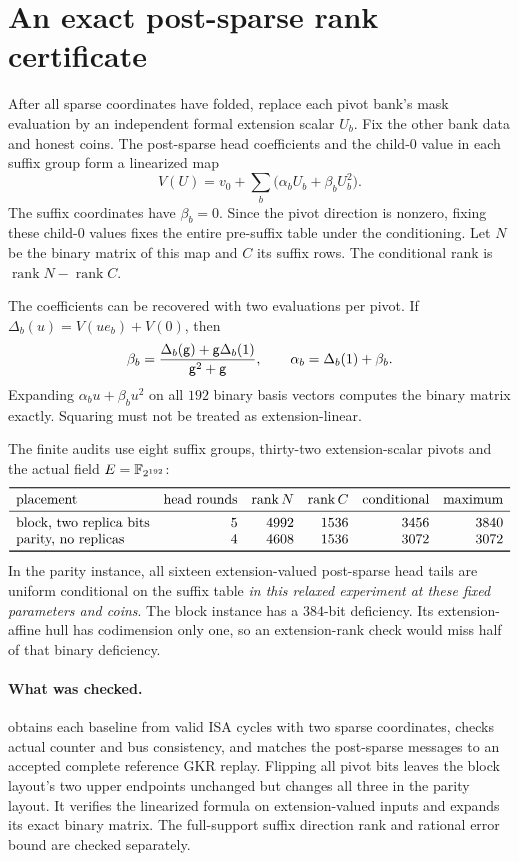 \documentclass[11pt]{article}
\begin{document}
\section{An exact post-sparse rank certificate}

After all sparse coordinates have folded, replace each pivot bank's mask evaluation by an independent formal extension scalar $U_b$. Fix the other bank data and honest coins. The post-sparse head coefficients and the child-$0$ value in each suffix group form a linearized map
\[
 V(U)=v_0+\sum_b\bigl(\alpha_bU_b+\beta_bU_b^2\bigr).
\]
The suffix coordinates have $\beta_b=0$. Since the pivot direction is nonzero, fixing these child-$0$ values fixes the entire pre-suffix table under the conditioning. Let $N$ be the binary matrix of this map and $C$ its suffix rows. The conditional rank is $\operatorname{rank}N-\operatorname{rank}C$.

The coefficients can be recovered with two evaluations per pivot. If $\Delta_b(u)=V(ue_b)+V(0)$, then
\[
 \beta_b=\frac{\Delta_b(\mathsf{g})+\mathsf{g}\Delta_b(1)}{\mathsf{g}^2+\mathsf{g}},
 \qquad \alpha_b=\Delta_b(1)+\beta_b.
\]
Expanding $\alpha_bu+\beta_bu^2$ on all $192$ binary basis vectors computes the binary matrix exactly. Squaring must not be treated as extension-linear.

The finite audits use eight suffix groups, thirty-two extension-scalar pivots and the actual field $E=\mathbb{F}_{2^{192}}$:
\[
\begin{array}{lrrrrr}
\toprule
\text{placement}&\text{head rounds}&\operatorname{rank}N&\operatorname{rank}C&\text{conditional}&\text{maximum}\\
\midrule
\text{block, two replica bits}&5&4992&1536&3456&3840\\
\text{parity, no replicas}&4&4608&1536&3072&3072\\
\bottomrule
\end{array}
\]
In the parity instance, all sixteen extension-valued post-sparse head tails are uniform conditional on the suffix table \emph{in this relaxed experiment at these fixed parameters and coins}. The block instance has a $384$-bit deficiency. Its extension-affine hull has codimension only one, so an extension-rank check would miss half of that binary deficiency.

\paragraph{What was checked.}  obtains each baseline from valid ISA cycles with two sparse coordinates, checks actual counter and bus consistency, and matches the post-sparse messages to an accepted complete reference GKR replay. Flipping all pivot bits leaves the block layout's two upper endpoints unchanged but changes all three in the parity layout. It verifies the linearized formula on extension-valued inputs and expands its exact binary matrix. The full-support suffix direction rank and rational error bound are checked separately.
\end{document}
